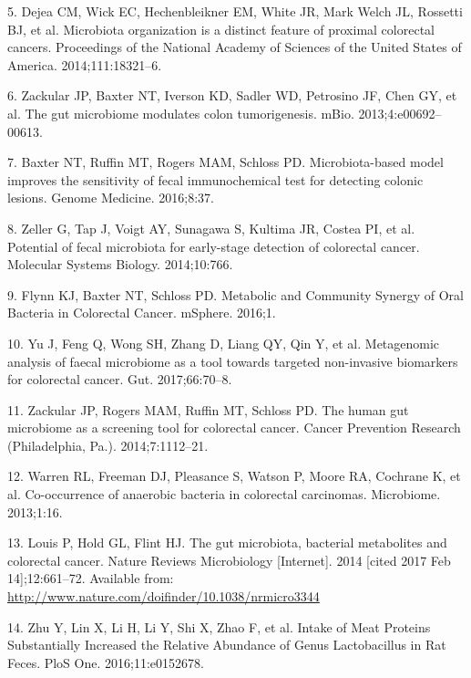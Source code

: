 \documentclass[12pt,]{article}
\begin{document}
\hypertarget{ref-dejea_microbiota_2014}{}
5. Dejea CM, Wick EC, Hechenbleikner EM, White JR, Mark Welch JL,
Rossetti BJ, et al. Microbiota organization is a distinct feature of
proximal colorectal cancers. Proceedings of the National Academy of
Sciences of the United States of America. 2014;111:18321--6.

\hypertarget{ref-zackular_gut_2013}{}
6. Zackular JP, Baxter NT, Iverson KD, Sadler WD, Petrosino JF, Chen GY,
et al. The gut microbiome modulates colon tumorigenesis. mBio.
2013;4:e00692--00613.

\hypertarget{ref-baxter_microbiota-based_2016}{}
7. Baxter NT, Ruffin MT, Rogers MAM, Schloss PD. Microbiota-based model
improves the sensitivity of fecal immunochemical test for detecting
colonic lesions. Genome Medicine. 2016;8:37.

\hypertarget{ref-zeller_potential_2014}{}
8. Zeller G, Tap J, Voigt AY, Sunagawa S, Kultima JR, Costea PI, et al.
Potential of fecal microbiota for early-stage detection of colorectal
cancer. Molecular Systems Biology. 2014;10:766.

\hypertarget{ref-flynn_metabolic_2016}{}
9. Flynn KJ, Baxter NT, Schloss PD. Metabolic and Community Synergy of
Oral Bacteria in Colorectal Cancer. mSphere. 2016;1.

\hypertarget{ref-yu_metagenomic_2017}{}
10. Yu J, Feng Q, Wong SH, Zhang D, Liang QY, Qin Y, et al. Metagenomic
analysis of faecal microbiome as a tool towards targeted non-invasive
biomarkers for colorectal cancer. Gut. 2017;66:70--8.

\hypertarget{ref-zackular_human_2014}{}
11. Zackular JP, Rogers MAM, Ruffin MT, Schloss PD. The human gut
microbiome as a screening tool for colorectal cancer. Cancer Prevention
Research (Philadelphia, Pa.). 2014;7:1112--21.

\hypertarget{ref-warren_co-occurrence_2013}{}
12. Warren RL, Freeman DJ, Pleasance S, Watson P, Moore RA, Cochrane K,
et al. Co-occurrence of anaerobic bacteria in colorectal carcinomas.
Microbiome. 2013;1:16.

\hypertarget{ref-louis_gut_2014}{}
13. Louis P, Hold GL, Flint HJ. The gut microbiota, bacterial
metabolites and colorectal cancer. Nature Reviews Microbiology
{[}Internet{]}. 2014 {[}cited 2017 Feb 14{]};12:661--72. Available from:
\url{http://www.nature.com/doifinder/10.1038/nrmicro3344}

\hypertarget{ref-zhu_intake_2016}{}
14. Zhu Y, Lin X, Li H, Li Y, Shi X, Zhao F, et al. Intake of Meat
Proteins Substantially Increased the Relative Abundance of Genus
Lactobacillus in Rat Feces. PloS One. 2016;11:e0152678.
\end{document}
